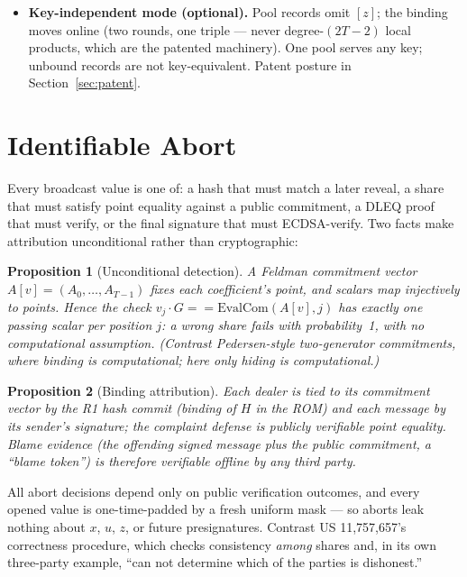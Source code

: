 \documentclass[11pt]{article}
\theoremstyle{plain}
\newtheorem{proposition}{Proposition}
\theoremstyle{definition}
\theoremstyle{remark}
\newcommand{\share}[1]{[#1]}
\newcommand{\EvalCom}{\mathrm{EvalCom}}
\begin{document}
\begin{itemize}[leftmargin=1.6em]
$k' = H(M\|\tau\|X)\cdot k$ is an RFC-6979-style message-derived nonce, so the attack's pre-computation window ceases to exist in the model. This makes OHM-ECDSA the second honest-majority scheme with a GS21 mitigation (after Groth--Shoup's service) and the only one compatible with direct inverse-dealing.
\item \textbf{Key-independent mode (optional).} Pool records omit $\share{z}$; the binding moves online (two rounds, one triple --- never degree-$(2T{-}2)$ local products, which are the patented machinery). One pool serves any key; unbound records are not key-equivalent. Patent posture in Section~\ref{sec:patent}.
\end{itemize}

\section{Identifiable Abort}\label{sec:abort}

Every broadcast value is one of: a hash that must match a later reveal, a share that must satisfy point equality against a public commitment, a DLEQ proof that must verify, or the final signature that must ECDSA-verify. Two facts make attribution unconditional rather than cryptographic:

\begin{proposition}[Unconditional detection]\label{prop:detection}
A Feldman commitment vector $A\share{v} = (A_0,\dots,A_{T-1})$ fixes each coefficient's point, and scalars map injectively to points. Hence the check $v_j \cdot G == \EvalCom(A\share{v}, j)$ has \emph{exactly one} passing scalar per position $j$: a wrong share fails with probability~1, with no computational assumption. (Contrast Pedersen-style two-generator commitments, where binding is computational; here only \emph{hiding} is computational.)
\end{proposition}

\begin{proposition}[Binding attribution]
Each dealer is tied to its commitment vector by the R1 hash commit (binding of $H$ in the ROM) and each message by its sender's signature; the complaint defense is publicly verifiable point equality. Blame evidence (the offending signed message plus the public commitment, a ``blame token'') is therefore verifiable offline by any third party.
\end{proposition}

All abort decisions depend only on public verification outcomes, and every opened value is one-time-padded by a fresh uniform mask --- so aborts leak nothing about $x$, $u$, $z$, or future presignatures. Contrast US 11,757,657's correctness procedure, which checks consistency \emph{among} shares and, in its own three-party example, ``can not determine which of the parties is dishonest.''
\end{document}
